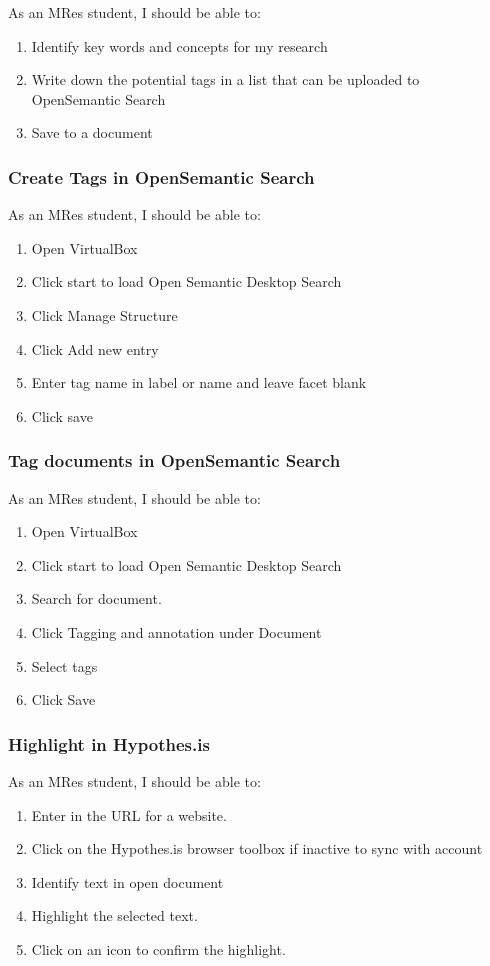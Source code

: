 \documentclass{article}
\begin{document}
As an MRes student, I should be able to:
\begin{enumerate}
\item Identify key words and concepts for my research
\item Write down the potential tags in a list that can be uploaded to OpenSemantic Search
\item Save to a document
\end{enumerate}

\subsubsection*{Create Tags in OpenSemantic Search}

As an MRes student, I should be able to:
\begin{enumerate}
\item Open VirtualBox
\item Click start to load Open Semantic Desktop Search
\item Click Manage Structure
\item Click Add new entry
\item Enter tag name in label or name and leave facet blank
\item Click save
\end{enumerate}

\subsubsection*{Tag documents in OpenSemantic Search}

As an MRes student, I should be able to:
\begin{enumerate}
\item Open VirtualBox
\item Click start to load Open Semantic Desktop Search
\item Search for document.
\item Click Tagging and annotation under Document
\item Select tags
\item Click Save
\end{enumerate}

\subsubsection*{Highlight in Hypothes.is}

As an MRes student, I should be able to: \begin{enumerate}
\item Enter in the URL for a website.
\item Click on the Hypothes.is browser toolbox if inactive to sync with account
\item Identify text in open document
\item Highlight the selected text. 
\item Click on an icon to confirm the highlight.
\end{enumerate}
\end{document}
